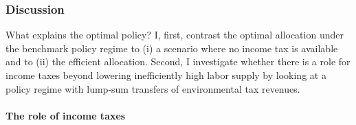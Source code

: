 




%





\subsubsection{Discussion}\label{subsec:dis}

 What explains the optimal policy?
 I, first, contrast the optimal allocation under the benchmark policy regime to (i) a scenario where no income tax is available and to (ii) the efficient allocation. Second, I investigate whether there is a role for income taxes beyond lowering inefficiently high labor supply by looking at a policy regime with lump-sum transfers of environmental tax revenues. 

\paragraph{The role of income taxes}\label{subsec:notaul}

